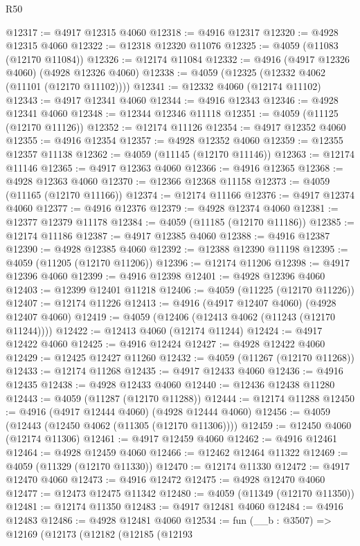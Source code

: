 \begin{lexlean}{R50}
\begin{coremodule}
@12317 := @4917 @12315 @4060
@12318 := @4916 @12317
@12320 := @4928 @12315 @4060
@12322 := @12318 @12320 @11076
@12325 := @4059 (@11083 (@12170 @11084))
@12326 := @12174 @11084
@12332 := @4916 (@4917 @12326 @4060) (@4928 @12326 @4060)
@12338 := @4059 (@12325 (@12332 @4062 (@11101 (@12170 @11102))))
@12341 := @12332 @4060 (@12174 @11102)
@12343 := @4917 @12341 @4060
@12344 := @4916 @12343
@12346 := @4928 @12341 @4060
@12348 := @12344 @12346 @11118
@12351 := @4059 (@11125 (@12170 @11126))
@12352 := @12174 @11126
@12354 := @4917 @12352 @4060
@12355 := @4916 @12354
@12357 := @4928 @12352 @4060
@12359 := @12355 @12357 @11138
@12362 := @4059 (@11145 (@12170 @11146))
@12363 := @12174 @11146
@12365 := @4917 @12363 @4060
@12366 := @4916 @12365
@12368 := @4928 @12363 @4060
@12370 := @12366 @12368 @11158
@12373 := @4059 (@11165 (@12170 @11166))
@12374 := @12174 @11166
@12376 := @4917 @12374 @4060
@12377 := @4916 @12376
@12379 := @4928 @12374 @4060
@12381 := @12377 @12379 @11178
@12384 := @4059 (@11185 (@12170 @11186))
@12385 := @12174 @11186
@12387 := @4917 @12385 @4060
@12388 := @4916 @12387
@12390 := @4928 @12385 @4060
@12392 := @12388 @12390 @11198
@12395 := @4059 (@11205 (@12170 @11206))
@12396 := @12174 @11206
@12398 := @4917 @12396 @4060
@12399 := @4916 @12398
@12401 := @4928 @12396 @4060
@12403 := @12399 @12401 @11218
@12406 := @4059 (@11225 (@12170 @11226))
@12407 := @12174 @11226
@12413 := @4916 (@4917 @12407 @4060) (@4928 @12407 @4060)
@12419 := @4059 (@12406 (@12413 @4062 (@11243 (@12170 @11244))))
@12422 := @12413 @4060 (@12174 @11244)
@12424 := @4917 @12422 @4060
@12425 := @4916 @12424
@12427 := @4928 @12422 @4060
@12429 := @12425 @12427 @11260
@12432 := @4059 (@11267 (@12170 @11268))
@12433 := @12174 @11268
@12435 := @4917 @12433 @4060
@12436 := @4916 @12435
@12438 := @4928 @12433 @4060
@12440 := @12436 @12438 @11280
@12443 := @4059 (@11287 (@12170 @11288))
@12444 := @12174 @11288
@12450 := @4916 (@4917 @12444 @4060) (@4928 @12444 @4060)
@12456 := @4059 (@12443 (@12450 @4062 (@11305 (@12170 @11306))))
@12459 := @12450 @4060 (@12174 @11306)
@12461 := @4917 @12459 @4060
@12462 := @4916 @12461
@12464 := @4928 @12459 @4060
@12466 := @12462 @12464 @11322
@12469 := @4059 (@11329 (@12170 @11330))
@12470 := @12174 @11330
@12472 := @4917 @12470 @4060
@12473 := @4916 @12472
@12475 := @4928 @12470 @4060
@12477 := @12473 @12475 @11342
@12480 := @4059 (@11349 (@12170 @11350))
@12481 := @12174 @11350
@12483 := @4917 @12481 @4060
@12484 := @4916 @12483
@12486 := @4928 @12481 @4060
@12534 := fun (__b : @3507) =>
  @12169
    (@12173
      (@12182
        (@12185
          (@12193

\end{coremodule}
\end{lexlean}
